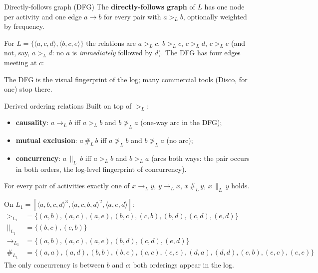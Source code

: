 \begin{definitionbox}{Directly-follows graph (DFG)}
The \textbf{directly-follows graph} of $L$ has one node per activity and one edge $a \to b$ for every pair with $a >_L b$, optionally weighted by frequency.
\end{definitionbox}

For $L = \{\langle a, c, d\rangle, \langle b, c, e\rangle\}$ the relations are $a >_L c$, $b >_L c$, $c >_L d$, $c >_L e$ (and not, say, $a >_L d$: no $a$ is \emph{immediately} followed by $d$). The DFG has four edges meeting at $c$:
\begin{center}
\end{center}
The DFG is the visual fingerprint of the log; many commercial tools (Disco, for one) stop there.

\begin{definitionbox}{Derived ordering relations}
Built on top of $>_L$:
\begin{itemize}
  \item \textbf{causality}: $a \to_L b$ iff $a >_L b$ and $b \not>_L a$ (one-way arc in the DFG);
  \item \textbf{mutual exclusion}: $a \,\#_L\, b$ iff $a \not>_L b$ and $b \not>_L a$ (no arc);
  \item \textbf{concurrency}: $a \,\|_L\, b$ iff $a >_L b$ and $b >_L a$ (arcs both ways: the pair occurs in both orders, the log-level fingerprint of concurrency).
\end{itemize}
\end{definitionbox}

For every pair of activities exactly one of $x \to_L y$, $y \to_L x$, $x \,\#_L\, y$, $x \,\|_L\, y$ holds.

On $L_1 = [\langle a, b, c, d\rangle^3, \langle a, c, b, d\rangle^2, \langle a, e, d\rangle]$:
\begin{align*}
>_{L_1} &= \{(a,b), (a,c), (a,e), (b,c), (c,b), (b,d), (c,d), (e,d)\} \\
\|_{L_1} &= \{(b,c), (c,b)\} \\
\to_{L_1} &= \{(a,b), (a,c), (a,e), (b,d), (c,d), (e,d)\} \\
\#_{L_1} &= \{(a,a), (a,d), (b,b), (b,e), (c,c), (c,e), (d,a), (d,d), (e,b), (e,c), (e,e)\}
\end{align*}
The only concurrency is between $b$ and $c$: both orderings appear in the log.


